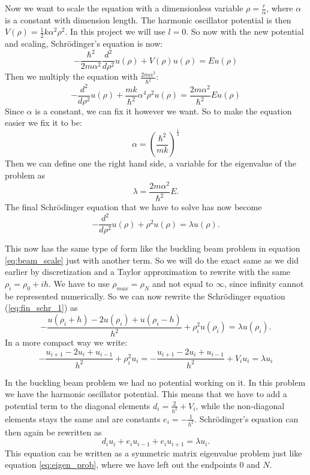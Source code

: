 \documentclass[12pt,a4paper,english]{article}
\begin{document}
Now we want to scale the equation with a dimensionless variable $\rho=\frac{r}{\alpha}$, where $\alpha$ is a constant with dimension length. The harmonic oscillator potential is then $V(\rho)=\frac{1}{2}k\alpha^2\rho^2$. In this project we will use $l=0$. So now with the new potential and scaling, Schrödinger's equation is now:
\begin{equation*}
-\frac{\hbar^2}{2m\alpha^2}\frac{d^2}{d\rho^2}u(\rho)+V(\rho)u(\rho)=Eu(\rho)
\end{equation*}
Then we multiply the equation with $\frac{2m\alpha^2}{\hbar^2}$:
\begin{equation*}
-\frac{d^2}{d\rho^2}u(\rho)+\frac{mk}{\hbar^2}\alpha^4\rho^2u(\rho)=\frac{2m\alpha^2}{\hbar^2}Eu(\rho)
\end{equation*}
Since $\alpha$ is a constant, we can fix it however we want. So to make the equation easier we fix it to be:
\[\alpha=\left(\frac{\hbar^2}{mk}\right)^{\frac{1}{4}}\]
Then we can define one the right hand side, a variable for the eigenvalue of the problem as 
\[\lambda=\frac{2m\alpha^2}{\hbar^2}E.\]
The final Schrödinger equation that we have to solve has now become
\begin{equation}
\label{eq:fin_schr_1}
-\frac{d^2}{d\rho^2}u(\rho)+\rho^2u(\rho)=\lambda u(\rho).
\end{equation}

This now has the same type of form like the buckling beam problem in equation \ref{eq:beam_scale} just with another term. So we will do the exact same as we did earlier by discretization and a Taylor approximation to rewrite with the same $\rho_i=\rho_0+ih$. We have to use $\rho_{max}=\rho_N$ and not equal to $\infty$, since infinity cannot be represented numerically. So we can now rewrite the Schrödinger equation (\ref{eq:fin_schr_1}) as 
\begin{equation*}
-\frac{u(\rho_i+h)-2u(\rho_i)+u(\rho_i-h)}{h^2}+\rho_i^2u(\rho_i)=\lambda u(\rho_i).
\end{equation*}
In a more compact way we write:
\begin{equation}
\label{eq:schr_discr_1}
-\frac{u_{i+1}-2u_i+u_{i-1}}{h^2}+\rho_i^2u_i=-\frac{u_{i+1}-2u_i+u_{i-1}}{h^2}+V_iu_i=\lambda u_i
\end{equation}

In the buckling beam problem we had no potential working on it. In this problem we have the harmonic oscillator potential. This means that we have to add a potential term to the diagonal elements $d_i=\frac{2}{h^2}+V_i$, while the non-diagonal elements stays the same and are constants $e_i=-\frac{1}{h^2}$. Schrödinger's equation can then again be rewritten as
\begin{equation}
\label{eq:schr_eigen_1}
d_iu_i+e_iu_{i-1}+e_iu_{i+1}=\lambda u_i.
\end{equation}
This equation can be written as a symmetric matrix eigenvalue problem just like equation \ref{eq:eigen_prob}, where we have left out the endpoints 0 and $N$.
\end{document}
